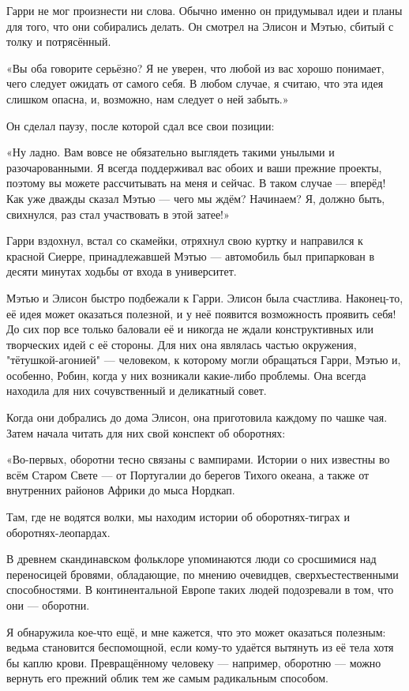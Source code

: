 \documentclass[a4paper,12pt]{book}
\begin{document}
Гарри не мог произнести ни слова. Обычно именно он придумывал идеи и планы для того, что они собирались делать. Он смотрел на Элисон и Мэтью, сбитый с толку и потрясённый.
\par
«Вы оба говорите серьёзно? Я не уверен, что любой из вас хорошо понимает, чего следует ожидать от самого себя. В любом случае, я считаю, что эта идея слишком опасна, и, возможно, нам следует о ней забыть.»
\par
Он сделал паузу, после которой сдал все свои позиции:
\par
«Ну ладно. Вам вовсе не обязательно выглядеть такими унылыми и разочарованными. Я всегда поддерживал вас обоих и ваши прежние проекты, поэтому вы можете рассчитывать на меня и сейчас. В таком случае — вперёд! Как уже дважды сказал Мэтью — чего мы ждём? Начинаем? Я, должно быть, свихнулся, раз стал участвовать в этой затее!»
\par
Гарри вздохнул, встал со скамейки, отряхнул свою куртку и направился к красной Сиерре, принадлежавшей Мэтью — автомобиль был припаркован в десяти минутах ходьбы от входа в университет.
\par
Мэтью и Элисон быстро подбежали к Гарри. Элисон была счастлива. Наконец-то, её идея может оказаться полезной, и у неё появится возможность проявить себя! До сих пор все только баловали её и никогда не ждали конструктивных или творческих идей с её стороны. Для них она являлась частью окружения, "тётушкой-агонией" — человеком, к которому могли обращаться Гарри, Мэтью и, особенно, Робин, когда у них возникали какие-либо проблемы. Она всегда находила для них сочувственный и деликатный совет.
\par
Когда они добрались до дома Элисон, она приготовила каждому по чашке чая. Затем начала читать для них свой конспект об оборотнях:
\par
«Во-первых, оборотни тесно связаны с вампирами. Истории о них известны во всём Старом Свете — от Португалии до берегов Тихого океана, а также от внутренних районов Африки до мыса Нордкап.
\par
Там, где не водятся волки, мы находим истории об оборотнях-тиграх и оборотнях-леопардах.
\par
В древнем скандинавском фольклоре упоминаются люди со сросшимися над переносицей бровями, обладающие, по мнению очевидцев, сверхъестественными способностями. В континентальной Европе таких людей подозревали в том, что они — оборотни.
\par
Я обнаружила кое-что ещё,  и мне кажется, что это может оказаться полезным: ведьма становится беспомощной, если кому-то удаётся вытянуть из её тела хотя бы каплю крови. Превращённому человеку — например, оборотню — можно вернуть его прежний облик тем же самым радикальным способом.
\end{document}
